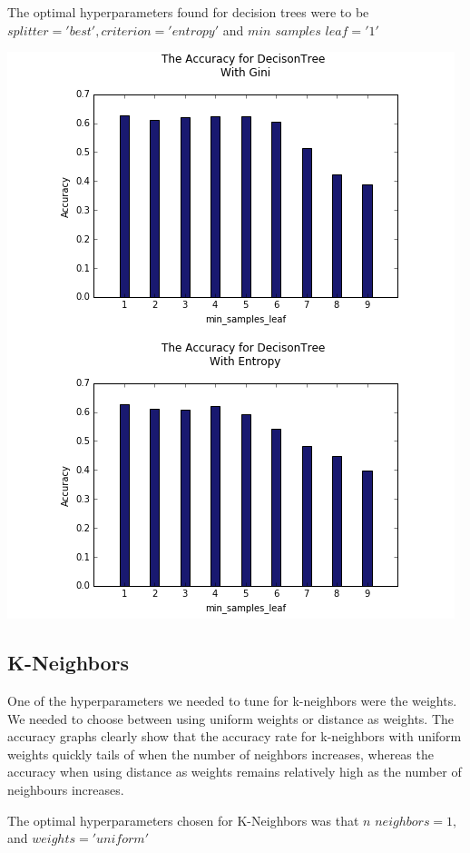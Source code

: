 \documentclass{article}
\begin{document}
The optimal hyperparameters found for decision trees were to be $splitter = 'best', criterion = 'entropy'$ and $min$ \textunderscore $samples$ \textunderscore $leaf = '1'$

\includegraphics[scale=0.6]{d_trees_crop}

\subsection{K-Neighbors}



One of the hyperparameters we needed to tune for k-neighbors were the weights. We needed to choose between using uniform weights or distance as weights. The accuracy graphs clearly show that the accuracy rate for k-neighbors with uniform weights quickly tails of when the number of neighbors increases, whereas the accuracy when using distance as weights remains relatively high as the number of neighbours increases. 

The optimal hyperparameters chosen for K-Neighbors was that $n$ \textunderscore $neighbors = 1,$ and $weights = 'uniform'$
\end{document}
